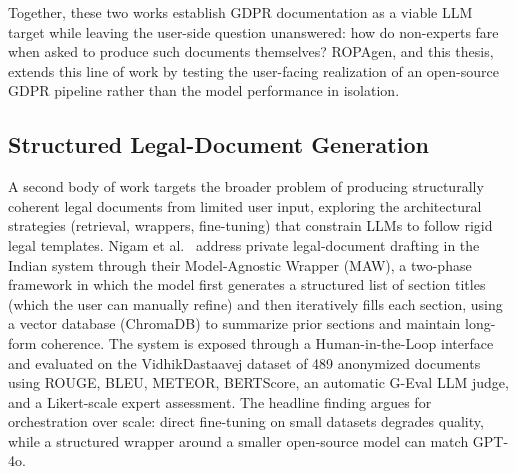 Together, these two works establish GDPR documentation as a viable LLM target while leaving the user-side question unanswered: how do non-experts fare when asked to produce such documents themselves? ROPAgen, and this thesis, extends this line of work by testing the user-facing realization of an open-source GDPR pipeline rather than the model performance in isolation.

\subsection{Structured Legal-Document Generation}

A second body of work targets the broader problem of producing structurally coherent legal documents from limited user input, exploring the architectural strategies (retrieval, wrappers, fine-tuning) that constrain LLMs to follow rigid legal templates. Nigam et al.\ \cite{nigamStructuredLegalDocument2025} address private legal-document drafting in the Indian system through their Model-Agnostic Wrapper (MAW), a two-phase framework in which the model first generates a structured list of section titles (which the user can manually refine) and then iteratively fills each section, using a vector database (ChromaDB) to summarize prior sections and maintain long-form coherence. The system is exposed through a Human-in-the-Loop interface and evaluated on the VidhikDastaavej dataset of 489 anonymized documents using ROUGE, BLEU, METEOR, BERTScore, an automatic G-Eval LLM judge, and a Likert-scale expert assessment. The headline finding argues for orchestration over scale: direct fine-tuning on small datasets degrades quality, while a structured wrapper around a smaller open-source model can match GPT-4o.

